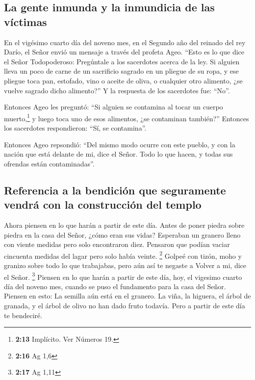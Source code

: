 \hypertarget{la-gente-inmunda-y-la-inmundicia-de-las-vuxedctimas}{%
\subsection{La gente inmunda y la inmundicia de las
víctimas}\label{la-gente-inmunda-y-la-inmundicia-de-las-vuxedctimas}}

 En el vigésimo cuarto día del noveno mes, en el Segundo
año del reinado del rey Darío, el Señor envió un mensaje a través del
profeta Ageo.  ``Esto es lo que dice el Señor
Todopoderoso: Pregúntale a los sacerdotes acerca de la ley.
 Si alguien lleva un poco de carne de un sacrificio
sagrado en un pliegue de su ropa, y ese pliegue toca pan, estofado, vino
o aceite de oliva, o cualquier otro alimento, ¿se vuelve sagrado dicho
alimento?'' Y la respuesta de los sacerdotes fue: ``No''.

 Entonces Ageo les preguntó: ``Si alguien se contamina al
tocar un cuerpo muerto,\footnote{\textbf{2:13} Implícito. Ver Números
  19.} y luego toca uno de esos alimentos, ¿se contaminan también?''
Entonces los sacerdotes respondieron: ``Sí, se contamina''.

 Entonces Ageo repsondió: ``Del mismo modo ocurre con
este pueblo, y con la nación que está delante de mi, dice el Señor. Todo
lo que hacen, y todas sus ofrendas están contaminadas''.

\hypertarget{referencia-a-la-bendiciuxf3n-que-seguramente-vendruxe1-con-la-construcciuxf3n-del-templo}{%
\subsection{Referencia a la bendición que seguramente vendrá con la
construcción del
templo}\label{referencia-a-la-bendiciuxf3n-que-seguramente-vendruxe1-con-la-construcciuxf3n-del-templo}}

 Ahora piensen en lo que harán a partir de este día.
Antes de poner piedra sobre piedra en la casa del Señor, 
¿cómo eran sus vidas? Esperaban un granero lleno con viente medidas pero
solo encontraron diez. Pensaron que podían vaciar cincuenta medidas del
lagar pero solo había veinte. \footnote{\textbf{2:16} Ag 1,6}
 Golpeé con tizón, moho y granizo sobre todo lo que
trabajabas, pero aún así te negaste a Volver a mi, dice el Señor.
\footnote{\textbf{2:17} Ag 1,11}  Piensen en lo que harán
a partir de este día, hoy, el vigesimo cuarto día del noveno mes, cuando
se puso el fundamento para la casa del Señor. Piensen en esto:
 La semilla aún está en el granero. La viña, la higuera,
el árbol de granada, y el árbol de olivo no han dado fruto todavía. Pero
a partir de este día te bendeciré.

